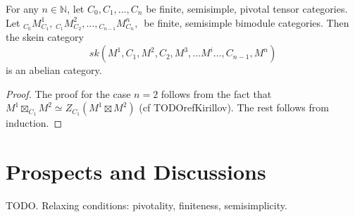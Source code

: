 \begin{corollary}\label{corollary/skein-category-is-abelian}
  For any $n \in \mathbb{N}$, let $C_{0}, C_{1}, \ldots, C_{n}$ be finite,
  semisimple, pivotal tensor categories. Let
  ${}_{C_{0}}M^{1}_{C_{1}}, \, {}_{C_{1}}M^{2}_{C_{2}}, \ldots, {}_{C_{n-1}}M^{n}_{C_{n}}, \, $
  be finite, semisimple bimodule categories. Then the skein category
  \[
    sk(M^{1}, C_{1}, M^{2}, C_{2}, M^{3}, \ldots M^{i} \ldots, C_{n-1}, M^{n})
  \]
  is an abelian category.
\end{corollary}
\begin{proof}
  The proof for the case $n=2$ follows from the fact that
  $M^{1} \boxtimes_{C_{1}} M^{2} \simeq Z_{C_{1}}(M^{1} \boxtimes M^{2})$ (cf
  TODOrefKirillov). The rest follows from induction.
\end{proof}

\section{Prospects and Discussions}

TODO. Relaxing conditions: pivotality, finiteness, semisimplicity.
